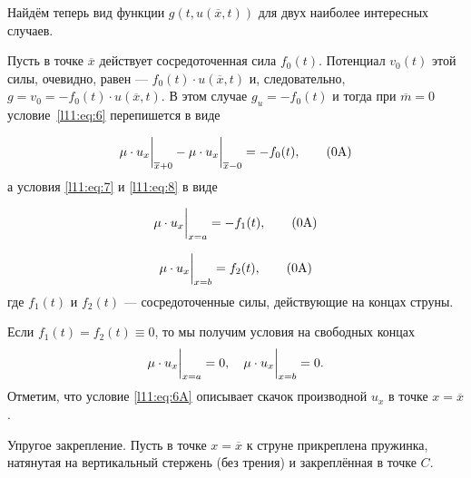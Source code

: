 Найдём теперь вид функции $g(t,u(\overline{x},t))$ для двух наиболее интересных случаев.
\begin{enumerateA}
	\item\label{l11:enum:A} Пусть в точке $\overline{x}$ действует сосредоточенная сила $f_0(t)$. Потенциал $v_0(t)$ этой силы, очевидно, равен --- $f_0(t)\cdot u(\overline{x},t)$ и, следовательно, $g=v_0=-f_0(t)\cdot u(\overline{x},t)$. В этом случае $g_u=-f_0(t)$ и тогда при $\overline{m}=0$ условие~\eqref{l11:eq:6} перепишется в виде 
	\addtocounter{equation}{-2}
	\begin{equation}
		\label{l11:eq:6A}
		\hfill\mu\cdot u_x\bigg|_{\overline{x}+0}-\mu\cdot u_x\bigg|_{\overline{x}-0}=-f_0(t), \tag{\theequation{}A}\hfill
	\end{equation} 
	а условия \eqref{l11:eq:7} и \eqref{l11:eq:8} в виде
	\addtocounter{equation}{1} 
	\begin{equation}
		\label{l11:eq:7A}
		\hfill\mu\cdot u_x\bigg|_{x=a}=-f_1(t),\tag{\theequation{}A}\hfill
	\end{equation}
	\vspace{-0.2cm}\addtocounter{equation}{1}
	\begin{equation}
		\label{l11:eq:8A}
		\hfill\mu\cdot u_x\bigg|_{x=b}=f_2(t),\tag{\theequation{}A}\hfill
	\end{equation}
	где $f_1(t)$ и $f_2(t)$ --- сосредоточенные силы, действующие на концах струны. 
	
	\noindent Если $f_1(t)=f_2(t)\equiv0$, то мы получим условия на свободных концах
	\begin{equation}
		\label{l11:eq:9}
		\hfill \mu\cdot u_x\bigg|_{x=a}=0,\quad\mu\cdot u_x\bigg|_{x=b}=0.\hfill
	\end{equation}
	Отметим, что условие \eqref{l11:eq:6A} описывает скачок производной $u_x$ в точке $x=\overline{x}$.
	\item Упругое закрепление. Пусть в точке $x=\overline{x}$ к струне прикреплена пружинка, натянутая на вертикальный стержень (без трения) и закреплённая в точке $C$.
	
	
	\begin{tikzpicture}[x=0.75pt,y=0.75pt,yscale=-1,xscale=1]
		

\end{tikzpicture}
\end{enumerateA}
